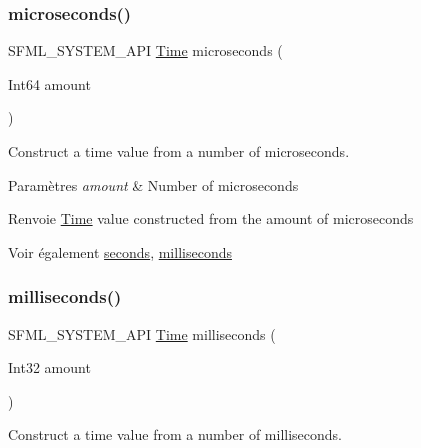 \subsubsection{\texorpdfstring{microseconds()}{microseconds()}}
{\footnotesize\ttfamily S\+F\+M\+L\+\_\+\+S\+Y\+S\+T\+E\+M\+\_\+\+A\+PI \hyperlink{classsf_1_1Time}{Time} microseconds (\begin{DoxyParamCaption}\item[{Int64}]{amount }\end{DoxyParamCaption})\hspace{0.3cm}{\ttfamily [related]}}



Construct a time value from a number of microseconds. 


\begin{DoxyParams}{Paramètres}
{\em amount} & Number of microseconds\\
\hline
\end{DoxyParams}
\begin{DoxyReturn}{Renvoie}
\hyperlink{classsf_1_1Time}{Time} value constructed from the amount of microseconds
\end{DoxyReturn}
\begin{DoxySeeAlso}{Voir également}
\hyperlink{classsf_1_1Time_ae36b9ef700f0ed0516abf0194ceb546b}{seconds}, \hyperlink{classsf_1_1Time_ae379d420bc07170668f51522023957b9}{milliseconds} 
\end{DoxySeeAlso}
\mbox{\label{classsf_1_1Time_ae379d420bc07170668f51522023957b9}} 
\subsubsection{\texorpdfstring{milliseconds()}{milliseconds()}}
{\footnotesize\ttfamily S\+F\+M\+L\+\_\+\+S\+Y\+S\+T\+E\+M\+\_\+\+A\+PI \hyperlink{classsf_1_1Time}{Time} milliseconds (\begin{DoxyParamCaption}\item[{Int32}]{amount }\end{DoxyParamCaption})\hspace{0.3cm}{\ttfamily [related]}}



Construct a time value from a number of milliseconds. 


